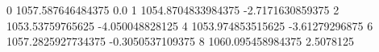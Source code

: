 0 1057.587646484375 0.0
1 1054.8704833984375 -2.7171630859375
2 1053.53759765625 -4.050048828125
4 1053.974853515625 -3.61279296875
6 1057.2825927734375 -0.3050537109375
8 1060.095458984375 2.5078125
